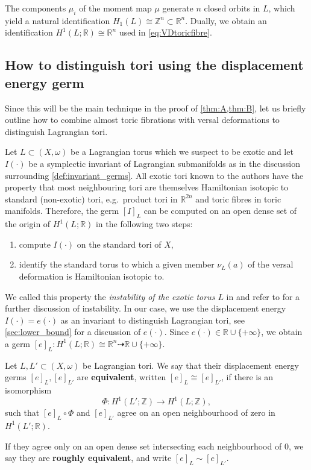 \documentclass[AIF,Unicode,manuscript]{cedram}
\begin{document}
The components $\mu_i$ of the moment map $\mu$ generate $n$ closed orbits in $L$, which yield a natural identification $H_1(L) \cong \mathbb{Z}^n \subset \mathbb{R}^n$.
Dually, we obtain an identification $H^1(L;\mathbb{R}) \cong \mathbb{R}^n$ used in \eqref{eq:VDtoricfibre}.

\subsection{How to distinguish tori using the displacement energy germ}
\label{sec:howto_exotic}

Since this will be the main technique in the proof of \cref{thm:A,thm:B}, let us briefly outline how to combine almost toric fibrations with versal deformations to distinguish Lagrangian tori. 

Let $L \subset (X,\omega)$ be a Lagrangian torus which we suspect to be exotic and let $I(\cdot)$ be a symplectic invariant of Lagrangian submanifolds as in the discussion surrounding \cref{def:invariant_germs}.
All exotic tori known to the authors have the property that most neighbouring tori are themselves Hamiltonian isotopic to standard (non-exotic) tori, e.g.\ product tori in $\mathbb{R}^{2n}$ and toric fibres in toric manifolds.
Therefore, the germ $[I]_L$ can be computed on an open dense set of the origin of $H^1(L;\mathbb{R})$ in the following two steps: 
\begin{enumerate}
    \item[(1)] compute $I(\cdot)$ on the standard tori of $X$, 
    \item[(2)] identify the standard torus to which a given member $\nu_L(a)$ of the versal deformation is Hamiltonian isotopic to. 
\end{enumerate}
We called this property the \textit{instability of the exotic torus $L$} in \cite{brendel2023local} and refer to \cite[Sections 1.6, 5.1]{brendel2023local} for a further discussion of instability.
In our case, we use the displacement energy $I(\cdot) = e(\cdot)$ as an invariant to distinguish Lagrangian tori, see \cref{sec:lower_bound} for a discussion of $e(\cdot)$.
Since $e(\cdot) \in \mathbb{R} \cup \{+\infty\}$, we obtain a germ $[e]_L \colon H^1(L;\mathbb{R}) \cong \mathbb{R}^n \dashrightarrow \mathbb{R} \cup \{+\infty\}$. 

\begin{definition}
    \label{def:deg_equiv}
    Let $L,L' \subset (X,\omega)$ be Lagrangian tori.
We say that their displacement energy germs $[e]_L,[e]_{L'}$ are \textbf{equivalent}, written $[e]_L \cong [e]_{L'}$, if there is an isomorphism 
    \begin{equation}
        \label{eq:phi_isomorphism}
        Φ \colon H^1(L';\mathbb{Z}) \rightarrow H^1(L;\mathbb{Z}),
    \end{equation}
    such that $[e]_L \circ Φ$ and $[e]_{L'}$ agree on an open neighbourhood of zero in $H^1(L';\mathbb{R})$.
    
    If they agree only on an open dense set intersecting each neighbourhood of $0$, we say they are \textbf{roughly equivalent}, and write $[e]_L \sim [e]_{L'}$.
\end{definition}
\end{document}
